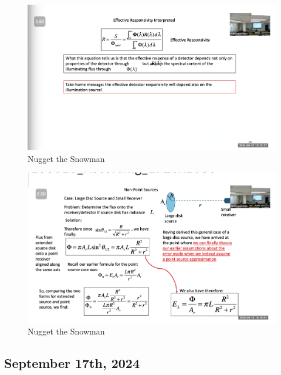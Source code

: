 \documentclass{article}
\begin{document}
\begin{figure}[h!]
\centering
\includegraphics[scale=.6]{Radiometry/Week3/Notes/LightSourceResponsivity.png}
\caption{Nugget the Snowman}
\label{fig:Light Source Responsivity}
\end{figure}


\begin{figure}[h!]
\centering
\includegraphics[scale=.6]{Radiometry/Week3/Notes/Mainpoint.png}
\caption{Nugget the Snowman}
\label{fig:Light Source Responsivity}
\end{figure}
\clearpage

\subsection{September 17th, 2024}
\end{document}
